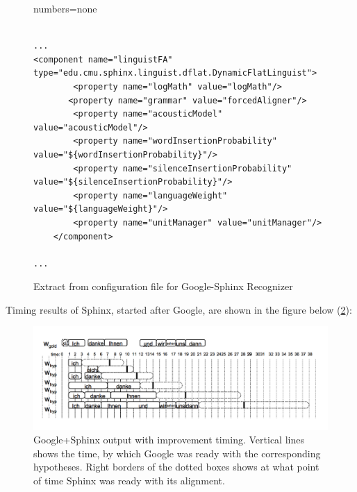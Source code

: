 \begin{figure}[htbp]
  \centering 
 
{numbers=none}  
\lstset{language=XML} 
\begin{lstlisting}[style=nonumbers]

...
<component name="linguistFA" type="edu.cmu.sphinx.linguist.dflat.DynamicFlatLinguist">  
        <property name="logMath" value="logMath"/>
       <property name="grammar" value="forcedAligner"/>   
        <property name="acousticModel" value="acousticModel"/>
        <property name="wordInsertionProbability" value="${wordInsertionProbability}"/>
        <property name="silenceInsertionProbability" value="${silenceInsertionProbability}"/>
        <property name="languageWeight" value="${languageWeight}"/>
        <property name="unitManager" value="unitManager"/>
    </component>

...
\end{lstlisting}
 \caption{Extract from configuration file for Google-Sphinx Recognizer}
  \label{fig:conf_al}
\end {figure}

Timing results of Sphinx, started after Google, are shown in the figure below
(\ref{fig:conf_al_timing}):
\begin{figure}[htbp]
  \centering
    \includegraphics[width=1.0\textwidth]{images/google_sphinx_output_al.png}
 \caption{Google+Sphinx output with improvement timing. Vertical lines shows
 the time, by which Google was ready with the corresponding hypotheses.
 Right borders of the dotted boxes shows at what point of time Sphinx was ready
 with its alignment.}
  \label{fig:conf_al_timing}
\end {figure}

